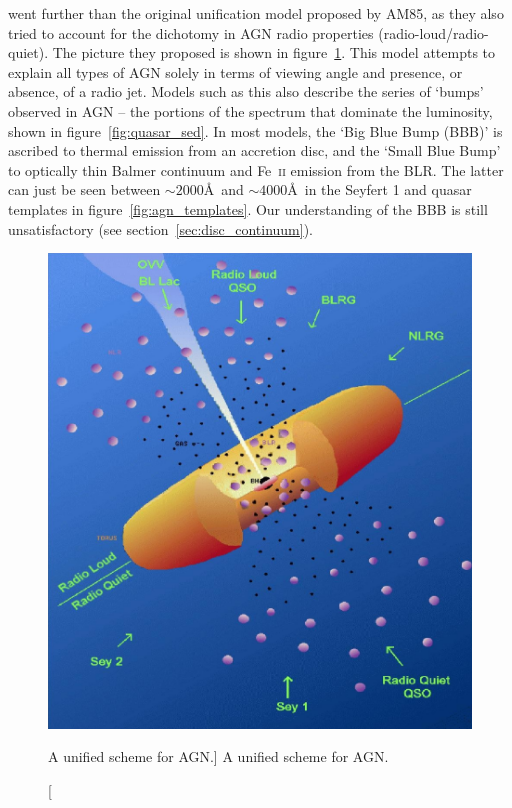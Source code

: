 \citet[][UP95]{UP95} went further than the original unification model
proposed by AM85, as they also tried to account for the dichotomy in 
AGN radio properties (radio-loud/radio-quiet).
The picture they proposed is shown in figure~\ref{fig:unification}.
This model attempts to explain all types of AGN 
solely in terms of viewing angle
and presence, or absence, of a radio jet. Models such as this also 
describe the series of `bumps' observed in AGN -- the portions
of the spectrum that dominate the luminosity, shown in figure~\ref{fig:quasar_sed}. 
In most models, the `Big Blue Bump (BBB)' is ascribed to thermal 
emission from an accretion disc, and the `Small Blue Bump' to optically 
thin Balmer continuum and Fe~\textsc{ii} emission from the BLR.
The latter can just be seen between $\sim2000$\AA\ and 
$\sim4000$\AA\ in the Seyfert 1 and 
quasar templates in figure~\ref{fig:agn_templates}.
Our understanding of the BBB is still unsatisfactory 
(see section~\ref{sec:disc_continuum}).

\begin{figure}
\centering
\includegraphics[width=1.0\textwidth]{figures/01-intro/up95.png}
\caption
[A unified scheme for AGN.]
{
A unified scheme for AGN.
} 
\label{fig:unification}
\end{figure} 

